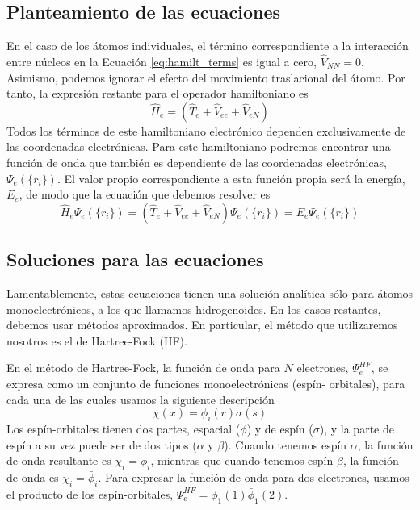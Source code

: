 \documentclass{tufte-book}
\begin{document}
\subsection{Planteamiento de las ecuaciones}
En el caso de los átomos individuales, el término correspondiente
a la interacción entre núcleos en la Ecuación \ref{eq:hamilt_terms}
es igual a cero, $\hat{V}_{NN}=0$. Asimismo, podemos ignorar el
efecto del movimiento traslacional del átomo. Por tanto, la expresión
restante para el operador hamiltoniano es
\begin{equation}
    \hat{H}_e   =
    (\hat{T}_e + \hat{V}_{ee} +\hat{V}_{eN})
\end{equation}
Todos los términos de este hamiltoniano electrónico dependen 
exclusivamente de las coordenadas electrónicas. Para este 
hamiltoniano podremos encontrar una función de onda que
también es dependiente de las coordenadas electrónicas,
$\Psi_e(\{r_i\})$. El valor propio correspondiente a esta
función propia será la energía, $E_e$, de modo que la 
ecuación que debemos resolver es
\begin{equation}
    \hat{H}_e\Psi_e(\{r_i\})   =
    (\hat{T}_e + \hat{V}_{ee} +\hat{V}_{eN})\Psi_e(\{r_i\})= E_e\Psi_e(\{r_i\})
\end{equation}

\subsection{Soluciones para las ecuaciones}
Lamentablemente, estas ecuaciones tienen una solución analítica
sólo para átomos monoelectrónicos, a los que llamamos 
hidrogenoides. En los casos restantes, debemos usar métodos
aproximados. En particular, el método que utilizaremos nosotros
es el de Hartree-Fock (HF). 

En el método de Hartree-Fock, 
la función de onda para $N$ electrones, $\Psi^{HF}_e$, se
expresa como un conjunto de funciones monoelectrónicas (espín-
orbitales), para cada una de las cuales usamos la siguiente
descripción
\begin{equation}
    \chi(x)=\phi_i(r)\sigma(s)
\end{equation}
Los espín-orbitales tienen dos partes, espacial ($\phi$) y 
de espín ($\sigma$), y la parte de espín a su vez puede ser 
de dos tipos ($\alpha$ y $\beta$). Cuando tenemos espín 
$\alpha$, la función de onda
resultante es $\chi_i=\phi_i$, mientras que cuando tenemos
espín $\beta$, la función de onda es $\chi_i=\bar{\phi}_i$.
Para expresar la función de onda para dos electrones, usamos
el producto de los espín-orbitales, 
$\Psi_e^{HF}=\phi_1(1)\bar{\phi}_1(2)$.
\end{document}
